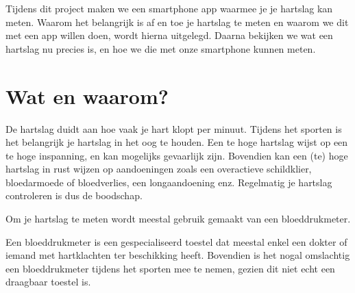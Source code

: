 
\begin{samenvatting}
Tijdens dit project maken we een smartphone app waarmee je je hartslag kan meten. Waarom het belangrijk is af en toe je hartslag te meten en waarom we dit met een app willen doen, wordt hierna uitgelegd. Daarna bekijken we wat een hartslag nu precies is, en hoe we die met onze smartphone kunnen meten.
\end{samenvatting}
%

\section{Wat en waarom?}
\label{sec:Mod1_Sec1}
%
De hartslag duidt aan hoe vaak je hart klopt per minuut. Tijdens het sporten is het belangrijk je hartslag in het oog te houden. Een te hoge hartslag wijst op een te hoge inspanning, en kan mogelijks gevaarlijk zijn. Bovendien kan een (te) hoge hartslag in rust wijzen op aandoeningen zoals een overactieve schildklier, bloedarmoede of bloedverlies, een longaandoening enz. Regelmatig je hartslag controleren is dus de boodschap.

Om je hartslag te meten wordt meestal gebruik gemaakt van een bloeddrukmeter.

\begin{minipage}{.5\linewidth}
\end{minipage} 
\begin{minipage}{.5\linewidth}
\end{minipage} 

Een bloeddrukmeter is een gespecialiseerd toestel dat meestal enkel een dokter of iemand met hartklachten ter beschikking heeft. Bovendien is het nogal omslachtig een bloeddrukmeter tijdens het sporten mee te nemen, gezien dit niet echt een draagbaar toestel is.


